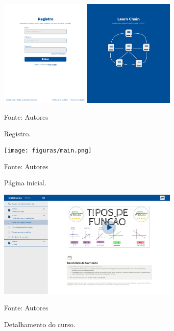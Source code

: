 \begin{apendicesenv}
    \begin{figure}[h]
        \centering
        \caption{Registro.}
        \includegraphics[width=0.8\textwidth]{figuras/Registro.png}
        \begin{center}
            {\footnotesize Fonte: Autores}
        \end{center}
        \label{fig:Registro}
    \end{figure}

    \begin{figure}[h]
        \centering
        \caption{Página inicial.}
        \texttt{[image: figuras/main.png]}
        \begin{center}
            {\footnotesize Fonte: Autores}
        \end{center}
        \label{fig:main}
    \end{figure}

    \begin{figure}[h]
        \centering
        \caption{Detalhamento do curso.}
        \includegraphics[width=0.8\textwidth]{figuras/detalhamento_do_curso.png}
        \begin{center}
            {\footnotesize Fonte: Autores}
        \end{center}
        \label{fig:detalhamento_do_curso}
    \end{figure}


\end{apendicesenv}

